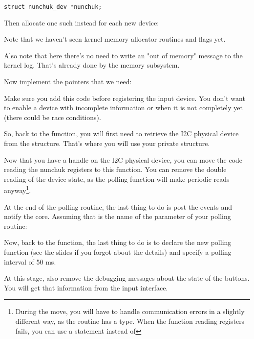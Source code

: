 \begin{verbatim}
struct nunchuk_dev *nunchuk;
\end{verbatim}

Then allocate one such instead for each new device:


Note that we haven't seen kernel memory allocator routines and flags
yet.

Also note that here there's no need to write an "out of memory"
message to the kernel log. That's already done by the memory subsystem.

Now implement the pointers that we need:


Make sure you add this code before registering the input device. You
don't want to enable a device with incomplete information or when it is
not completely yet (there could be race conditions).

So, back to the  function, you will first need to
retrieve the I2C physical device from the 
structure. That's where you will use your private 
structure.

Now that you have a handle on the I2C physical device, you can move the
code reading the nunchuk registers to this function. You can
remove the double reading of the device state, as the polling function
will make periodic reads anyway\footnote{During the move, you will have
to handle communication errors in a slightly different way, as the
 routine has a  type. When the function
reading registers fails, you can use a  statement instead
of }.

At the end of the polling routine, the last thing to do is post the events
and notify the  core. Assuming that  is the
name of the  parameter of your polling routine:


Now, back to the  function, the last thing to do
is to declare the new polling function (see the slides if you forgot
about the details) and specify a polling interval of 50 ms.

At this stage, also remove the debugging messages about the state
of the buttons. You will get that information from the input interface.


